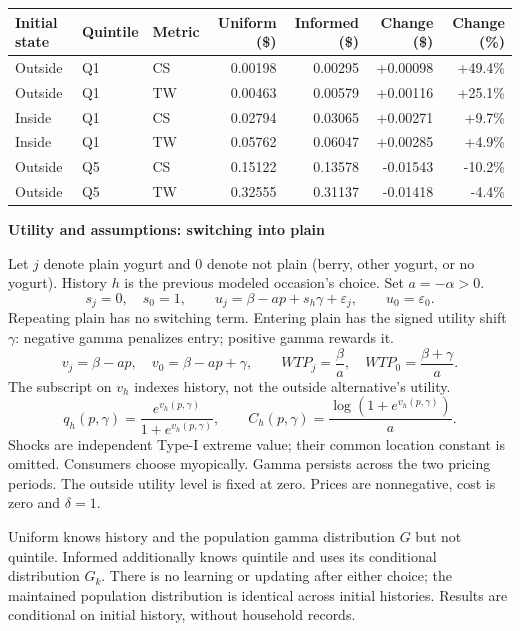 \documentclass[11pt]{article}
\newcommand{\titleline}[1]{{\Large\bfseries #1}\par\vspace{3pt}}
\begin{document}
\begin{center}
\renewcommand{\arraystretch}{1.4}
\begin{tabular}{lllrrrr}
\toprule
Initial state & Quintile & Metric & Uniform (\$) & Informed (\$) & Change (\$) & Change (\%)\\
\midrule
Outside & Q1 & CS & 0.00198 & 0.00295 & +0.00098 & +49.4\% \\
Outside & Q1 & TW & 0.00463 & 0.00579 & +0.00116 & +25.1\% \\
Inside & Q1 & CS & 0.02794 & 0.03065 & +0.00271 & +9.7\% \\
Inside & Q1 & TW & 0.05762 & 0.06047 & +0.00285 & +4.9\% \\
Outside & Q5 & CS & 0.15122 & 0.13578 & -0.01543 & -10.2\% \\
Outside & Q5 & TW & 0.32555 & 0.31137 & -0.01418 & -4.4\% \\
\bottomrule
\end{tabular}
\end{center}
\newpage
\titleline{Utility and assumptions: switching into plain}
Let $j$ denote plain yogurt and $0$ denote not plain (berry, other yogurt, or no yogurt).
History $h$ is the previous modeled occasion's choice. Set $a=-\alpha>0$.
\[
s_j=0,\quad s_0=1,\qquad
u_j=\beta-ap+s_h\gamma+\varepsilon_j,\qquad u_0=\varepsilon_0.
\]
Repeating plain has no switching term. Entering plain has the signed utility shift $\gamma$:
negative gamma penalizes entry; positive gamma rewards it.
\[
v_j=\beta-ap,\quad v_0=\beta-ap+\gamma,\qquad
WTP_j=\frac{\beta}{a},\quad WTP_0=\frac{\beta+\gamma}{a}.
\]
The subscript on $v_h$ indexes history, not the outside alternative's utility.
\[
q_h(p,\gamma)=\frac{e^{v_h(p,\gamma)}}{1+e^{v_h(p,\gamma)}},\qquad
C_h(p,\gamma)=\frac{\log(1+e^{v_h(p,\gamma)})}{a}.
\]
Shocks are independent Type-I extreme value; their common location constant is omitted.
Consumers choose myopically. Gamma persists across the two pricing periods.
The outside utility level is fixed at zero. Prices are nonnegative, cost is zero and $\delta=1$.

Uniform knows history and the population gamma distribution $G$ but not quintile.
Informed additionally knows quintile and uses its conditional distribution $G_k$.
There is no learning or updating after either choice; the maintained population distribution
is identical across initial histories. Results are conditional on initial history, without household records.
\end{document}
